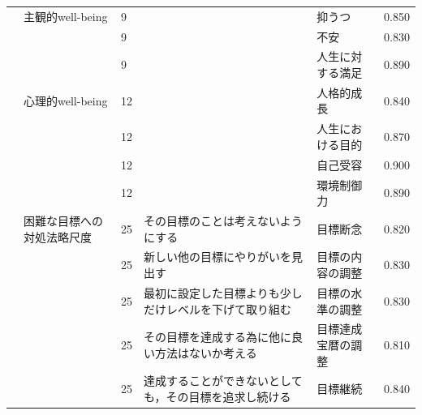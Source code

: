 \begin{landscape}
\begin{longtable}{p{2cm}p{2cm}p{2cm}p{6cm}p{2cm}p{2cm}}
		                         & 主観的well-being                    & 9   &                                                     & 抑うつ                  & 0.850      \\
		                         &                                  & 9   &                                                     & 不安                   & 0.830      \\
		                         &                                  & 9   &                                                     & 人生に対する満足             & 0.890      \\
		                         & 心理的well-being                    & 12  &                                                     & 人格的成長                & 0.840      \\
		                         &                                  & 12  &                                                     & 人生における目的             & 0.870      \\
		                         &                                  & 12  &                                                     & 自己受容                 & 0.900      \\
		                         &                                  & 12  &                                                     & 環境制御力                & 0.890      \\
		                         & 困難な目標への対処法略尺度                    & 25  & その目標のことは考えないようにする                                   & 目標断念                 & 0.820      \\
		                         &                                  & 25  & 新しい他の目標にやりがいを見出す                                    & 目標の内容の調整             & 0.830      \\
		                         &                                  & 25  & 最初に設定した目標よりも少しだけレベルを下げて取り組む                         & 目標の水準の調整             & 0.830      \\
		                         &                                  & 25  & その目標を達成する為に他に良い方法はないか考える                            & 目標達成宝暦の調整            & 0.810      \\
		                         &                                  & 25  & 達成することができないとしても，その目標を追求し続ける                         & 目標継続                 & 0.840      \\

\end{longtable}
\end{landscape}

